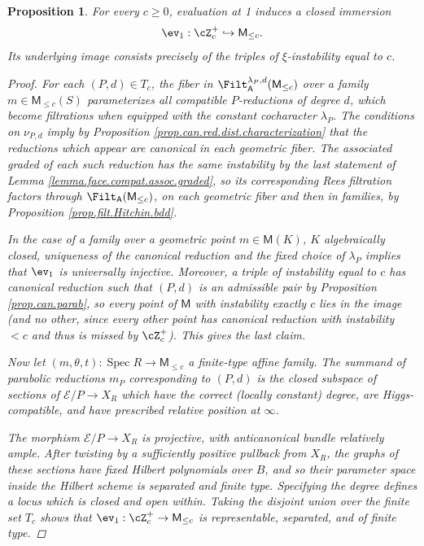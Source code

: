 \documentclass[openany]{amsbook}
\newtheorem{proposition}[theorem]{Proposition}
\theoremstyle{definition}
\theoremstyle{remark}
\numberwithin{equation}{section}
\newcommand{\cE}{\mathcal{E}}
\renewcommand{\-}{\operatorname{-}}
\newcommand{\Spec}{\operatorname{Spec}}
\newcommand{\bM}{\mathsf{M}}
\newcommand{\bA}{\mathsf{A}}
\begin{document}
\begin{proposition}
    For every $c \ge 0$, evaluation at 1 induces a closed immersion
    $$
        \ev_1 : \cZ_{c}^+ \hookrightarrow \bM_{\le c}.
    $$
    Its underlying image consists precisely of the triples of $\xi$-instability equal to $c$.
    \begin{proof}
        For each $(P,d) \in T_c$, the fiber in $\Filt^{\lambda_P, d}_{\bA}(\bM_{\le c})$ over a family $m \in \bM_{\le c}(S)$ parameterizes all compatible $P$-reductions of degree $d$, which become filtrations when equipped with the constant cocharacter $\lambda_P$. The conditions on $\nu_{P,d}$ imply by Proposition \ref{prop.can.red.dist.characterization} that the reductions which appear are canonical in each geometric fiber. The associated graded of each such reduction has the same instability by the last statement of Lemma \ref{lemma.face.compat.assoc.graded}, so its corresponding Rees filtration factors through $\Filt_{\bA}(\bM_{\le c})$, on each geometric fiber and then in families, by Proposition \ref{prop.filt.Hitchin.bdd}.

        In the case of a family over a geometric point $m \in \bM(K)$, $K$ algebraically closed, uniqueness of the canonical reduction and the fixed choice of $\lambda_P$ implies that $\ev_1$ is universally injective. Moreover, a triple of instability equal to $c$ has canonical reduction such that $(P,d)$ is an admissible pair by Proposition \ref{prop.can.parab}, so every point of $\bM$ with instability exactly $c$ lies in the image (and no other, since every other point has canonical reduction with instability $< c$ and thus is missed by $\cZ_c^+$). This gives the last claim.

        Now let $(m, \theta, t) : \Spec R \to \bM_{\le c}$ a finite-type affine family. The summand of parabolic reductions $m_P$ corresponding to $(P, d)$ is the closed subspace of sections of $\cE/P \to X_R$ which have the correct (locally constant) degree, are Higgs-compatible, and have prescribed relative position at $\infty$. 

        The morphism $\cE/P \to X_R$ is projective, with anticanonical bundle relatively ample. After twisting by a sufficiently positive pullback from $X_R$, the graphs of these sections have fixed Hilbert polynomials over $B$, and so their parameter space inside the Hilbert scheme is separated and finite type. Specifying the degree defines a locus which is closed and open within. Taking the disjoint union over the finite set $T_c$ shows that $\ev_1 : \cZ_c^+ \to \bM_{\le c}$ is representable, separated, and of finite type.
        

\end{proof}
\end{proposition}
\end{document}
